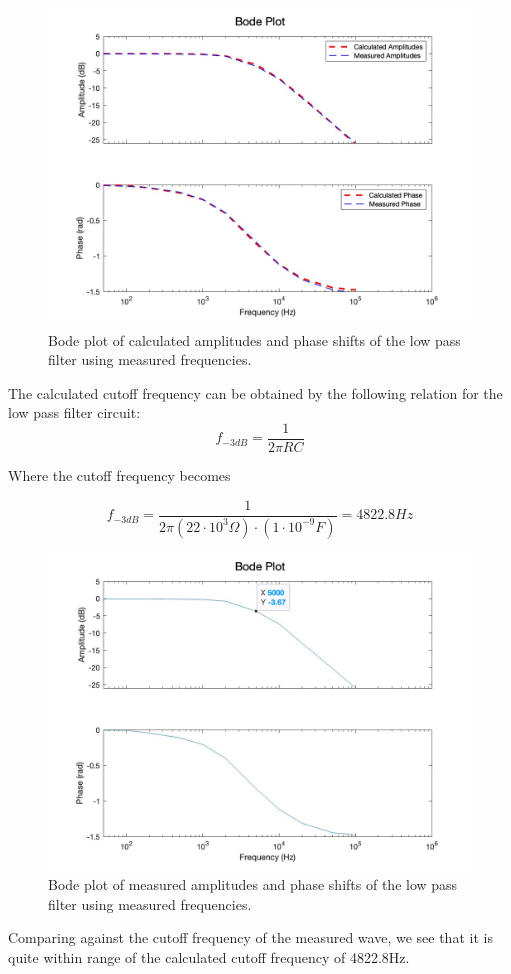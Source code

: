 \begin{figure}[H]
    \centering
    \includegraphics[scale=0.3]{images/bode_plot_low_pass_calculated.jpg}
    \caption{Bode plot of calculated amplitudes and phase shifts of the low pass filter using measured frequencies.}
\end{figure}



The calculated cutoff frequency can be obtained by the following relation for the low pass filter circuit:
\begin{equation}
    f_{-3dB} = \frac{1}{2\pi RC}
\end{equation}

Where the cutoff frequency becomes

\begin{equation}
    f_{-3dB} = \frac{1}{2\pi (22\cdot 10^3\Omega)\cdot(1\cdot 10^{-9}{F})} = 4822.8{Hz}
\end{equation}

\begin{figure}[H]
    \centering
    \includegraphics[scale=0.3]{images/bode_plot_low_pass_measured_cutoff.jpg}
    \caption{Bode plot of measured amplitudes and phase shifts of the low pass filter using measured frequencies.}
\end{figure}
Comparing against the cutoff frequency of the measured wave, we see that it is quite within range of the calculated cutoff frequency of 4822.8{Hz}.

